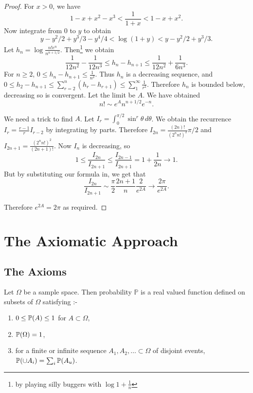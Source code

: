 \documentclass{notes}
\theoremstyle{plain}
\newcommand{\bP}{\mathbb{P}}
\newcommand{\prob}[1]{\bP \negthinspace\left(#1\right)}
\begin{document}
\begin{proof}
For $x > 0$, we have
\[
1 - x + x^2 - x^3 < \frac{1}{1+x} < 1 - x + x^2.
\]
Now integrate from $0$ to $y$ to obtain
\[
y - y^2/2 + y^3/3 - y^4/4 < \log(1+y) < y - y^2/2 + y^3/3.
\]
Let $h_n = \log \frac{n! e^n}{n^{n+1/2}}$.  Then\footnote{by playing silly
buggers with $\log 1+\tfrac{1}{n}$} we obtain
\[
\frac{1}{12 n^2} - \frac{1}{12 n^3} \le h_n - h_{n+1} \le \frac{1}{12 n^2}
+ \frac{1}{6 n^3}.
\]
For $n \ge 2$, $0 \le h_n - h_{n+1} \le \frac{1}{n^2}$.  Thus $h_n$ is a
decreasing sequence, and $0 \le h_2 - h_{n+1} \le \sum_{r=2}^n (h_r - h_{r+1})
\le \sum_1^\infty \tfrac{1}{r^2}$.  Therefore $h_n$ is bounded below,
decreasing so is convergent.  Let the limit be $A$.  We have obtained
\[
n! \sim e^A n^{n+1/2} e^{-n}.
\]

We need a trick to find $A$.  Let $I_r = \int_0^{\pi/2} \sin^r \theta\, d\theta$.
We obtain the recurrence $I_r = \tfrac{r-1}{r}I_{r-2}$ by integrating by parts.
Therefore $I_{2 n} = \tfrac{(2 n)!}{(2^n n!)^2} \pi/2$ and
$I_{2n + 1} = \tfrac{(2^n n!)^2}{(2n+1)!}$.
Now $I_n$ is decreasing, so
\[
1 \le \frac{I_{2 n}}{I_{2 n +1}} \le \frac{I_{2 n - 1}}{I_{2 n + 1}}
= 1 + \frac{1}{2 n} \rightarrow 1.
\]
But by substituting our formula in, we get that
\[
\frac{I_{2 n}}{I_{2 n + 1}} \sim \frac{\pi}{2} \frac{2 n + 1}{n}
\frac{2}{e^{2 A}} \rightarrow \frac{2 \pi}{e^{2 A}}.
\]

Therefore $e^{2 A} = 2 \pi$ as required.
\end{proof}

\chapter{The Axiomatic Approach}

\section{The Axioms}

Let $\Omega$ be a sample space.  Then probability $\bP$ is a real valued
function defined on subsets of $\Omega$ satisfying :-

\begin{enumerate}
\item $0 \le \prob{A} \le 1$ for $A \subset \Omega$,
\item $\prob{\Omega} = 1$,
\item for a finite or infinite sequence $A_1, A_2, \dots \subset \Omega$ of
disjoint events, $\prob{\cup A_i} = \sum_i \prob{A_u}$.
\end{enumerate}
\end{document}
